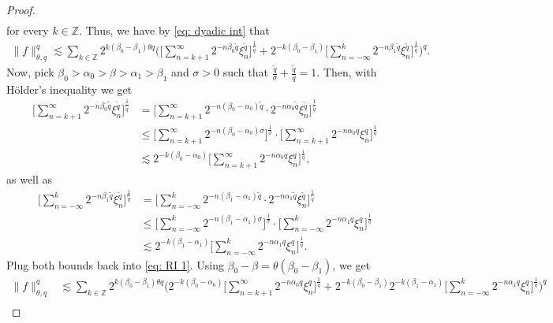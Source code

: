 \documentclass[11pt, leqno,parskip=half]{amsart}
\theoremstyle{definition}
\newcommand{\IZ}{\mathbb{Z}}
\numberwithin{equation}{section}
\begin{document}
\begin{proof}
\begin{align*}
    \end{align*}
    for every $k\in\IZ$. Thus, we have by \eqref{eq: dyadic int} that
    \begin{align}
    \label{eq: RI 1}
         \|f\|^q_{\theta,q} \lesssim  \sum\limits_{k\in\IZ} 2^{k(\beta_0-\beta_1)\theta q} \bigg(\Big[\sum\limits_{n = k+1}^\infty 2^{-n\beta_0 \tilde q} \xi_n^{\tilde q} \Big]^\frac{1}{\tilde q} + 2^{-k(\beta_0-\beta_1)}\Big[\sum\limits_{n = -\infty}^k 2^{-n\beta_1 \tilde q} \xi_n^{\tilde q} \Big]^\frac{1}{\tilde q}\bigg)^q.
    \end{align}
    Now, pick $\beta_0>\alpha_0 >\beta >\alpha_1>\beta_1$ and $\sigma>0$ such that $\frac{\tilde q}{\sigma}+\frac{\tilde q}{q}  = 1$. Then, with Hölder's inequality we get
    \begin{align*}
        \Big[\sum\limits_{n = k+1}^\infty 2^{-n\beta_0  \tilde q} \xi_n^{\tilde q} \Big]^\frac{1}{\tilde q} &= \Big[\sum\limits_{n = k+1}^\infty 2^{-n(\beta_0-\alpha_0) \tilde q} \cdot 2^{-n\alpha_0  \tilde q}\xi_n^{\tilde q} \Big]^\frac{1}{\tilde q}\\
        &\leq \Big[\sum\limits_{n = k+1}^\infty 2^{-n(\beta_0-\alpha_0) \sigma}\Big]^\frac{1}{\sigma}\cdot \Big[\sum\limits_{n = k+1}^\infty 2^{-n\alpha_0  q}\xi^{q}_n \Big]^\frac{1}{ q}\\
        &\lesssim 2^{-k(\beta_0-\alpha_0)}\Big[\sum\limits_{n = k+1}^\infty  2^{-n\alpha_0  q}\xi^{q}_n \Big]^\frac{1}{ q},
    \end{align*}
    as well as
    \begin{align*}
        \Big[\sum\limits_{n = -\infty}^k 2^{-n\beta_1 \tilde q} \xi_n^{\tilde q} \Big]^\frac{1}{\tilde q} &= \Big[\sum\limits_{n = -\infty}^k 2^{-n(\beta_1-\alpha_1) \tilde q} \cdot 2^{-n\alpha_1 \tilde q}\xi_n^{\tilde q} \Big]^\frac{1}{\tilde q}\\
        &\leq \Big[\sum\limits_{n = -\infty}^k 2^{-n(\beta_1-\alpha_1) \sigma}\Big]^\frac{1}{\sigma} \cdot \Big[\sum\limits_{n = -\infty}^k  2^{-n\alpha_1 q}\xi_n^{ q} \Big]^\frac{1}{q}\\
        &\lesssim 2^{-k(\beta_1-\alpha_1)}\Big[\sum\limits_{n = -\infty}^k  2^{-n\alpha_1  q}\xi_n^{ q} \Big]^\frac{1}{q}.
    \end{align*}
    Plug both bounds back into \eqref{eq: RI 1}. Using $\beta_0 - \beta = \theta(\beta_0-\beta_1)$, we get
    \begin{align*}
        \|f\|^q_{\theta,q} &\lesssim \sum\limits_{k\in\IZ} 2^{k(\beta_0-\beta_1)\theta q} \bigg(2^{-k(\beta_0-\alpha_0)}\Big[\sum\limits_{n = k+1}^\infty  2^{-n\alpha_0 q}\xi^{q}_n \Big]^\frac{1}{ q} + 2^{-k(\beta_0-\beta_1)}2^{-k(\beta_1-\alpha_1)}\Big[\sum\limits_{n = -\infty}^k  2^{-n\alpha_1   q}\xi_n^{ q} \Big]^\frac{1}{q}\bigg)^q\\

\end{align*}
\end{proof}
\end{document}
